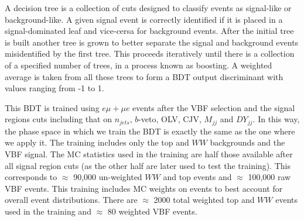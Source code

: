 A decision tree is a collection of cuts designed to classify events as signal-like or background-like. A given signal event is correctly identified if it is placed in a signal-dominated leaf and vice-cersa for background events. After the initial tree is built another tree is grown to better separate the signal and background events misidentified by the first tree. This proceeds iteratively until there is a collection of a specified number of trees, in a process known as boosting. A weighted average is taken from all these trees to form a BDT output discriminant with values ranging from -1 to 1.

This BDT is trained using $e\mu+\mu e$ events after the VBF selection and the signal regions cuts including that on $n_{jets}$, $b$-veto, OLV, CJV, $M_{jj}$ and $DY_{jj}$. In this way, the phase space in which we train the BDT is exactly the same as the one where we apply it. The training includes only the top and $WW$ backgrounds and the VBF signal. The MC statistics used in the training are half those available after all signal region cuts (as the other half are later used to test the training). This corresponds to $\approx$ 90,000 un-weighted $WW$ and top events and $\approx$ 100,000 raw VBF events. This training includes MC weights on events to best account for overall event distributions. There are $\approx$ 2000 total weighted top and $WW$ events used in the training and $\approx$ 80 weighted VBF events. 

